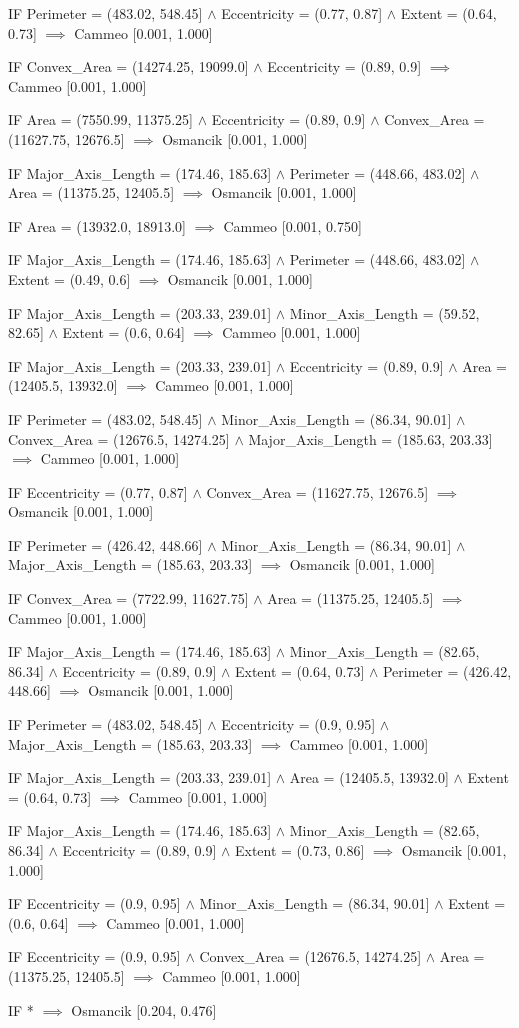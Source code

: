 IF Perimeter = (483.02, 548.45] $\land$ Eccentricity = (0.77, 0.87] $\land$ Extent = (0.64, 0.73] $\implies$ Cammeo [0.001, 1.000]

IF Convex\_Area = (14274.25, 19099.0] $\land$ Eccentricity = (0.89, 0.9] $\implies$ Cammeo [0.001, 1.000]

IF Area = (7550.99, 11375.25] $\land$ Eccentricity = (0.89, 0.9] $\land$ Convex\_Area = (11627.75, 12676.5] $\implies$ Osmancik [0.001, 1.000]

IF Major\_Axis\_Length = (174.46, 185.63] $\land$ Perimeter = (448.66, 483.02] $\land$ Area = (11375.25, 12405.5] $\implies$ Osmancik [0.001, 1.000]

IF Area = (13932.0, 18913.0] $\implies$ Cammeo [0.001, 0.750]

IF Major\_Axis\_Length = (174.46, 185.63] $\land$ Perimeter = (448.66, 483.02] $\land$ Extent = (0.49, 0.6] $\implies$ Osmancik [0.001, 1.000]

IF Major\_Axis\_Length = (203.33, 239.01] $\land$ Minor\_Axis\_Length = (59.52, 82.65] $\land$ Extent = (0.6, 0.64] $\implies$ Cammeo [0.001, 1.000]

IF Major\_Axis\_Length = (203.33, 239.01] $\land$ Eccentricity = (0.89, 0.9] $\land$ Area = (12405.5, 13932.0] $\implies$ Cammeo [0.001, 1.000]

IF Perimeter = (483.02, 548.45] $\land$ Minor\_Axis\_Length = (86.34, 90.01] $\land$ Convex\_Area = (12676.5, 14274.25] $\land$ Major\_Axis\_Length = (185.63, 203.33] $\implies$ Cammeo [0.001, 1.000]

IF Eccentricity = (0.77, 0.87] $\land$ Convex\_Area = (11627.75, 12676.5] $\implies$ Osmancik [0.001, 1.000]

IF Perimeter = (426.42, 448.66] $\land$ Minor\_Axis\_Length = (86.34, 90.01] $\land$ Major\_Axis\_Length = (185.63, 203.33] $\implies$ Osmancik [0.001, 1.000]

IF Convex\_Area = (7722.99, 11627.75] $\land$ Area = (11375.25, 12405.5] $\implies$ Cammeo [0.001, 1.000]

IF Major\_Axis\_Length = (174.46, 185.63] $\land$ Minor\_Axis\_Length = (82.65, 86.34] $\land$ Eccentricity = (0.89, 0.9] $\land$ Extent = (0.64, 0.73] $\land$ Perimeter = (426.42, 448.66] $\implies$ Osmancik [0.001, 1.000]

IF Perimeter = (483.02, 548.45] $\land$ Eccentricity = (0.9, 0.95] $\land$ Major\_Axis\_Length = (185.63, 203.33] $\implies$ Cammeo [0.001, 1.000]

IF Major\_Axis\_Length = (203.33, 239.01] $\land$ Area = (12405.5, 13932.0] $\land$ Extent = (0.64, 0.73] $\implies$ Cammeo [0.001, 1.000]

IF Major\_Axis\_Length = (174.46, 185.63] $\land$ Minor\_Axis\_Length = (82.65, 86.34] $\land$ Eccentricity = (0.89, 0.9] $\land$ Extent = (0.73, 0.86] $\implies$ Osmancik [0.001, 1.000]

IF Eccentricity = (0.9, 0.95] $\land$ Minor\_Axis\_Length = (86.34, 90.01] $\land$ Extent = (0.6, 0.64] $\implies$ Cammeo [0.001, 1.000]

IF Eccentricity = (0.9, 0.95] $\land$ Convex\_Area = (12676.5, 14274.25] $\land$ Area = (11375.25, 12405.5] $\implies$ Cammeo [0.001, 1.000]

IF * $\implies$ Osmancik [0.204, 0.476]
